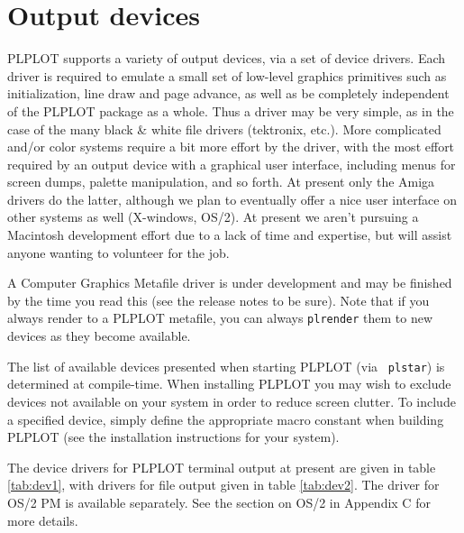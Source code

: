 \chapter{Output devices}
\label{ap:dev}

PLPLOT supports a variety of output devices, via a set of device drivers.
Each driver is required to emulate a small set of low-level graphics
primitives such as initialization, line draw and page advance, as well
as be completely independent of the PLPLOT package as a whole.  Thus a
driver may be very simple, as in the case of the many black \& white file
drivers (tektronix, etc.).  More complicated and/or color systems require a
bit more effort by the driver, with the most effort required by an output
device with a graphical user interface, including menus for screen dumps,
palette manipulation, and so forth.  At present only the Amiga drivers do
the latter, although we plan to eventually offer a nice user interface
on other systems as well (X-windows, OS/2).  At present we aren't pursuing
a Macintosh development effort due to a lack of time and expertise, but
will assist anyone wanting to volunteer for the job.

A Computer Graphics Metafile driver is under development and may be finished
by the time you read this (see the release notes to be sure).  Note that if
you always render to a PLPLOT metafile, you can always {\tt plrender} them
to new devices as they become available.

The list of available devices presented when starting PLPLOT (via {\tt
plstar}) is determined at compile-time.  When installing PLPLOT you may wish
to exclude devices not available on your system in order to reduce screen
clutter.  To include a specified device, simply define the appropriate macro
constant when building PLPLOT (see the installation instructions for your
system).

The device drivers for PLPLOT terminal output at present are given in table
\ref{tab:dev1}, with drivers for file output given in table \ref{tab:dev2}. 
The driver for OS/2 PM is available separately.  See the section on OS/2 in
Appendix C for more details.

